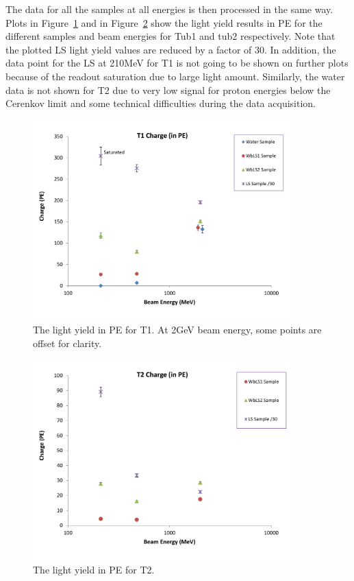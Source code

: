 \documentclass[preprint,12pt]{elsarticle}
\begin{document}
The data for all the samples at all energies is then processed in the same way. Plots in Figure~\ref{tub1signalInPE} and in Figure~\ref{tub2signalInPE} show the light yield results in PE for the different samples and beam energies for Tub1 and tub2 respectively. Note that the plotted LS light yield values are reduced by a factor of 30. In addition, the data point for the LS at 210MeV for T1 is not going to be shown on further plots because of the readout saturation due to large light amount. Similarly, the water data is not shown for T2 due to very low signal for proton energies below the Cerenkov limit and some technical difficulties during the data acquisition.

\begin{figure}[ht]
	\centering
		\includegraphics[width=100mm]{tub1signalInPE.pdf}
	\caption{The light yield in PE for T1. At 2GeV beam energy, some points are offset for clarity.}
	\label{tub1signalInPE}
\end{figure}

\begin{figure}[ht]
	\centering
		\includegraphics[width=100mm]{tub2signalInPE.pdf}
	\caption{The light yield in PE for T2.}
	\label{tub2signalInPE}
\end{figure}
\end{document}
